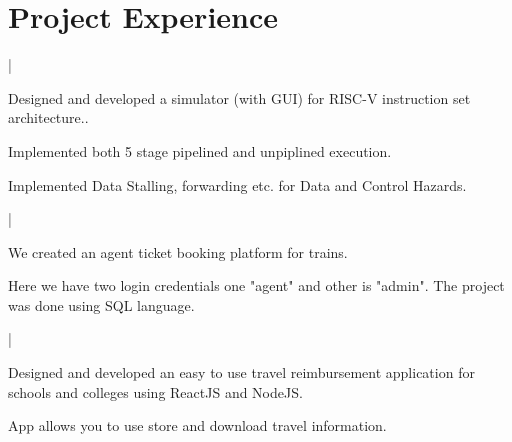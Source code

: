 \documentclass[letterpaper]{deedy-resume}
\begin{document}
\begin{minipage}[t]{0.66\textwidth} 

\section{Project Experience}

 |

\vspace{\topsep} 
\begin{tightitemize}
\item Designed and developed a simulator (with GUI) for RISC-V instruction set architecture..\\
\item Implemented both 5 stage pipelined and unpiplined execution.\\
\item Implemented Data Stalling, forwarding etc. for Data and Control
Hazards. 
\end{tightitemize}

\sectionspace 

 |

\begin{tightitemize}
\item We created an agent ticket booking platform for trains.
\item Here we have two login credentials one "agent" and other is "admin". The project was done using SQL language.
\end{tightitemize}

\sectionspace 


 |

\begin{tightitemize}
\item Designed and developed an easy to use travel reimbursement
application for schools and colleges using ReactJS and NodeJS.\\
\item App allows you to use store and download travel information.
\end{tightitemize}

\sectionspace 
 

\end{minipage}
\end{document}
